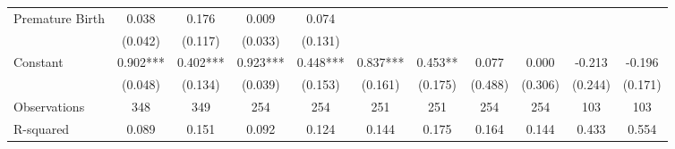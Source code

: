 \begin{tabular}{lcccccccccc}
Premature Birth & 0.038 & 0.176 & 0.009 & 0.074 &  &  &  &  &  &  \\
 & (0.042) & (0.117) & (0.033) & (0.131) &  &  &  &  &  &  \\
Constant & 0.902*** & 0.402*** & 0.923*** & 0.448*** & 0.837*** & 0.453** & 0.077 & 0.000 & -0.213 & -0.196 \\
 & (0.048) & (0.134) & (0.039) & (0.153) & (0.161) & (0.175) & (0.488) & (0.306) & (0.244) & (0.171) \\
\midrule
Observations & 348 & 349 & 254 & 254 & 251 & 251 & 254 & 254 & 103 & 103 \\
 R-squared & 0.089 & 0.151 & 0.092 & 0.124 & 0.144 & 0.175 & 0.164 & 0.144 & 0.433 & 0.554 \\ \bottomrule
\end{tabular}
